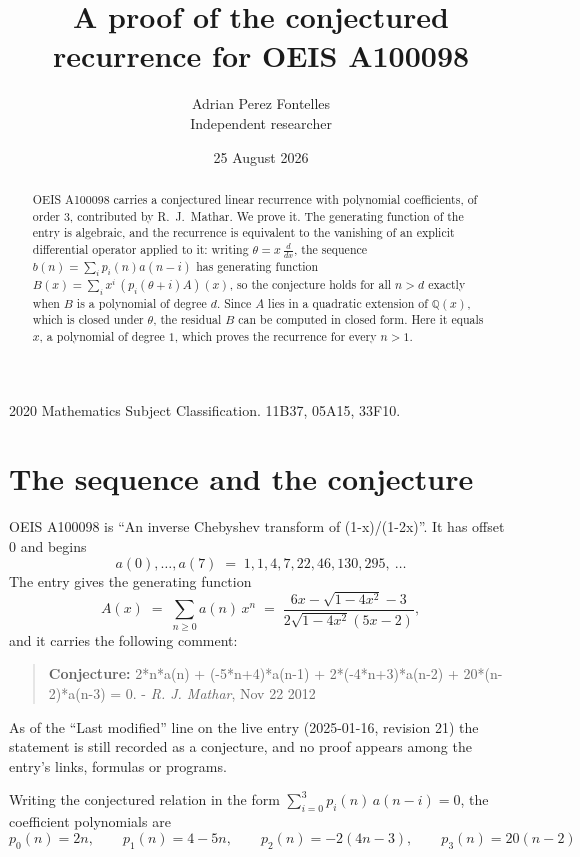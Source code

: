\documentclass[11pt,a4paper]{article}
\title{A proof of the conjectured recurrence for OEIS A100098}
\author{Adrian Perez Fontelles\\ \small Independent researcher}
\date{25 August 2026}
\theoremstyle{plain}
\theoremstyle{definition}
\begin{document}
\maketitle

\begin{abstract}
OEIS A100098 carries a conjectured linear recurrence with polynomial coefficients, of
order 3, contributed by R.~J.~Mathar. We prove it. The generating function of the
entry is algebraic, and the recurrence is equivalent to the vanishing of an explicit
differential operator applied to it: writing $\theta=x\,\frac{d}{dx}$, the sequence
$b(n)=\sum_{i}p_{i}(n)a(n-i)$ has generating function
$B(x)=\sum_{i}x^{i}\,(p_{i}(\theta+i)A)(x)$, so the conjecture holds for all $n>d$ exactly
when $B$ is a polynomial of degree $d$. Since $A$ lies in a quadratic extension of
$\mathbb{Q}(x)$, which is closed under $\theta$, the residual $B$ can be computed in
closed form. Here it equals $x$, a polynomial of degree $1$, which proves
the recurrence for every $n>1$.
\end{abstract}

\noindent\small 2020 Mathematics Subject Classification. 11B37, 05A15, 33F10.\normalsize

\section{The sequence and the conjecture}

OEIS A100098 is ``An inverse Chebyshev transform of (1-x)/(1-2x)''. It has offset $0$ and begins
\[
a(0),\dots,a(7)\;=\;1, 1, 4, 7, 22, 46, 130, 295,\ \dots
\]
The entry gives the generating function
\begin{equation}\label{eq:gf}
A(x)\;=\;\sum_{n\ge 0} a(n)\,x^{n}\;=\;\frac{6 x - \sqrt{1 - 4 x^{2}} - 3}{2 \sqrt{1 - 4 x^{2}} \left(5 x - 2\right)} ,
\end{equation}
and it carries the following comment:
\begin{quote}\small
\textbf{Conjecture:} 2*n*a(n) + (-5*n+4)*a(n-1) + 2*(-4*n+3)*a(n-2) + 20*(n-2)*a(n-3) = 0. - \emph{R. J. Mathar}, Nov 22 2012
\end{quote}
As of the ``Last modified'' line on the live entry (2025-01-16, revision 21) the
statement is still recorded as a conjecture, and no proof appears among the entry's links,
formulas or programs.

Writing the conjectured relation in the form $\sum_{i=0}^{3}p_{i}(n)\,a(n-i)=0$,
the coefficient polynomials are
\[
p_{0}(n)=2 n,\qquad p_{1}(n)=4 - 5 n,\qquad p_{2}(n)=- 2 \left(4 n - 3\right),\qquad p_{3}(n)=20 \left(n - 2\right)
\]
\end{document}
